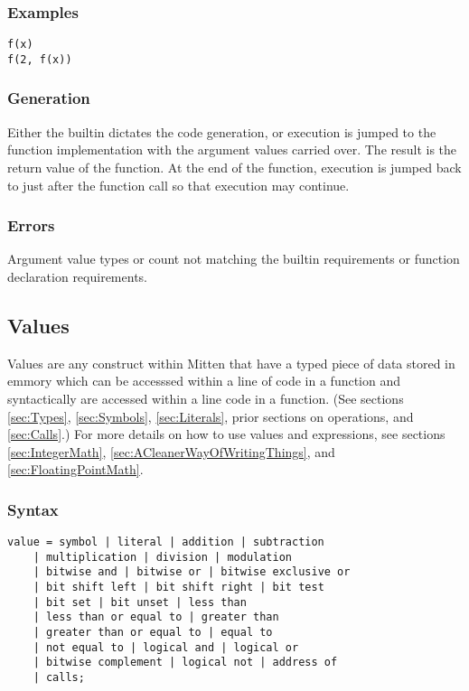 \documentclass[10pt,a4paper]{article}
\begin{document}
\subsubsection{Examples}
\begin{verbatim}
f(x)
f(2, f(x))
\end{verbatim}

\subsubsection{Generation}
Either the builtin dictates the code generation, or execution is jumped to the function implementation with the argument values carried over. The result is the return value of the function. At the end of the function, execution is jumped back to just after the function call so that execution may continue.

\subsubsection{Errors}
Argument value types or count not matching the builtin requirements or function declaration requirements.

\newpage




\subsection{Values}
\label{sec:Values}
Values are any construct within Mitten that have a typed piece of data stored in emmory which can be accesssed within a line of code in a function and syntactically are accessed within a line code in a function. (See sections \ref{sec:Types}, \ref{sec:Symbols}, \ref{sec:Literals}, prior sections on operations, and \ref{sec:Calls}.) For more details on how to use values and expressions, see sections \ref{sec:IntegerMath}, \ref{sec:ACleanerWayOfWritingThings}, and \ref{sec:FloatingPointMath}.

\subsubsection{Syntax}
\begin{verbatim}
value = symbol | literal | addition | subtraction
    | multiplication | division | modulation
    | bitwise and | bitwise or | bitwise exclusive or
    | bit shift left | bit shift right | bit test
    | bit set | bit unset | less than
    | less than or equal to | greater than
    | greater than or equal to | equal to
    | not equal to | logical and | logical or
    | bitwise complement | logical not | address of
    | calls;
\end{verbatim}
\end{document}
